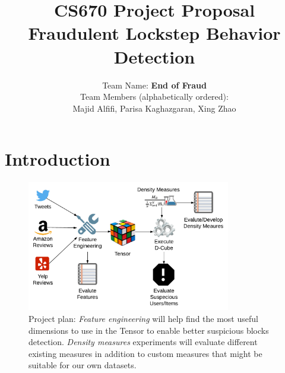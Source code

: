 \documentclass[10pt,twocolumn]{article}
\begin{document}
\title{CS670 Project Proposal\\Fraudulent Lockstep Behavior Detection}

\author{
Team Name: \textbf{End of Fraud}\\[2ex]
Team Members \small{(alphabetically ordered)}:\\[1ex]
Majid Alfifi, Parisa Kaghazgaran,  Xing Zhao
}

\maketitle

%

\section{Introduction}
 

\begin{figure}[!b]
  \begin{center}
    \includegraphics[width=3.5in]{figure.pdf}
  \end{center}
  \caption{\small Project plan: \emph{Feature engineering} will help find the most useful dimensions to use in the Tensor to enable better suspicious blocks detection. \emph{Density measures} experiments will evaluate different existing measures in addition to custom measures that might be suitable for our own datasets.}
  \label{fig:process}

\end{figure}
\end{document}
